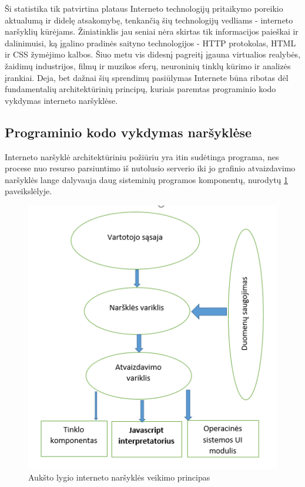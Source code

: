 \documentclass{VUMIFPSkursinis}
\begin{document}
Ši statistika tik patvirtina plataus Interneto technologijų pritaikymo poreikio aktualumą ir didelę atsakomybę, tenkančią šių technologijų vedliams - interneto naršyklių kūrėjams. Žiniatinklis jau seniai nėra skirtas tik informacijos paieškai ir dalinimuisi, ką įgalino pradinės saityno technologijos - HTTP protokolas, HTML ir CSS žymėjimo kalbos. Šiuo metu vis didesnį pagreitį įgauna virtualios realybės, žaidimų industrijos, filmų ir muzikos sferų, neuroninių tinklų kūrimo ir analizės įrankiai. Deja, bet dažnai šių sprendimų pasiūlymas Internete būna ribotas dėl fundamentalių architektūrinių principų, kuriais paremtas programinio kodo vykdymas interneto naršyklėse.

\subsection{Programinio kodo vykdymas naršyklėse}
Interneto naršyklė architektūriniu požiūriu yra itin sudėtinga programa, nes procese nuo resurso parsiuntimo iš nutolusio serverio iki jo grafinio atvaizdavimo naršyklės lange dalyvauja daug sisteminių programos komponentų, nurodytų \ref{fig:browser_architecture} paveikslėlyje. 

\begin{figure}[h!]
  \begin{center}
  \includegraphics[scale=0.8]{naršyklės_architektūra.png}
  \end{center}
  \caption{Aukšto lygio interneto naršyklės veikimo principas}
  \label{fig:browser_architecture}
\end{figure}
\end{document}
